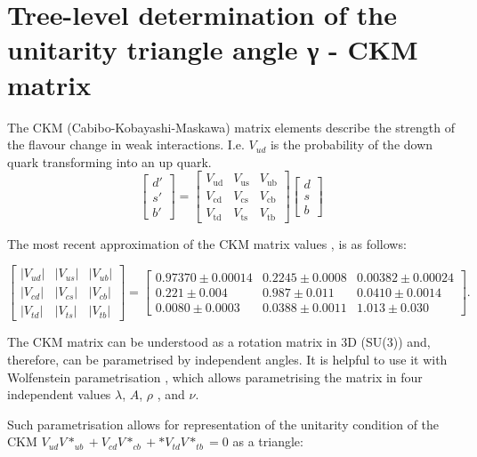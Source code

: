 \section{Tree-level determination of the unitarity triangle angle γ - CKM matrix}
\label{sec:tree-ckm}

The CKM (Cabibo-Kobayashi-Maskawa) matrix elements describe the strength of the flavour change in weak interactions. I.e. $V_{ud}$ is the probability of the down quark transforming into an up quark.
$$
\begin{bmatrix}  d'  \\  s'  \\  b'  \end{bmatrix} = \begin{bmatrix} V_\mathrm{ud} & V_\mathrm{us} & V_\mathrm{ub} \\ V_\mathrm{cd} & V_\mathrm{cs} & V_\mathrm{cb} \\ V_\mathrm{td} & V_\mathrm{ts} & V_\mathrm{tb} \end{bmatrix} \begin{bmatrix}  d  \\  s  \\  b  \end{bmatrix}
$$

The most recent approximation of the CKM matrix values \cite{10.1093/ptep/ptaa104}, is as follows:

$$
\begin{bmatrix}
|V_{ud}| & |V_{us}| & |V_{ub}| \\
|V_{cd}| & |V_{cs}| & |V_{cb}| \\
|V_{td}| & |V_{ts}| & |V_{tb}|
\end{bmatrix} = \begin{bmatrix}
0.97370 \pm 0.00014 & 0.2245 \pm 0.0008 & 0.00382 \pm 0.00024 \\
0.221 \pm 0.004 & 0.987 \pm 0.011 & 0.0410 \pm 0.0014 \\
0.0080 \pm 0.0003 & 0.0388 \pm 0.0011  & 1.013 \pm 0.030
\end{bmatrix}.
$$


The CKM matrix can be understood as a rotation matrix in 3D (SU(3)) and, therefore, can be parametrised by independent angles.
It is helpful to use it with Wolfenstein parametrisation \cite{PhysRevLett.51.1945}, which allows parametrising the matrix in four independent values $\lambda$, $A$, $\rho$ , and $\nu$.

Such parametrisation allows for representation of the unitarity condition of the CKM  $V_{ud}V*_{ub} + V_{cd}V*_{cb}+ * V_{td}V*_{tb} = 0$ as a triangle:


